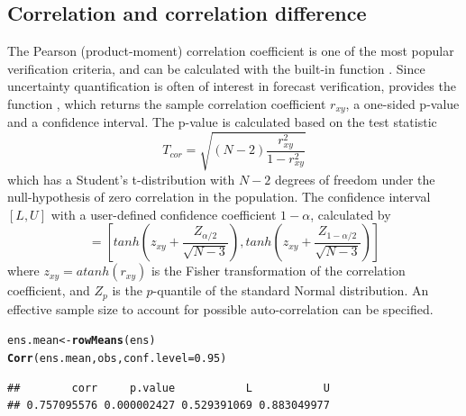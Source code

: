\documentclass[article]{jss}\usepackage{graphicx, color}
\makeatletter
\newcommand{\hlfunctioncall}[1]{\textcolor[rgb]{0,0.501960784313725,0.752941176470588}{\textbf{#1}}}%
\newenvironment{kframe}{%
 \def\at@end@of@kframe{}%
 \ifinner\ifhmode%
  \def\at@end@of@kframe{\end{minipage}}%
  \begin{minipage}{\columnwidth}%
 \fi\fi%
 \def\FrameCommand##1{\hskip\@totalleftmargin \hskip-\fboxsep
 \colorbox{shadecolor}{##1}\hskip-\fboxsep
     \hskip-\linewidth \hskip-\@totalleftmargin \hskip\columnwidth}%
 \MakeFramed {\advance\hsize-\width
   \@totalleftmargin\z@ \linewidth\hsize
   \@setminipage}}%
 {\par\unskip\endMakeFramed%
 \at@end@of@kframe}
\newenvironment{knitrout}{}{} %
\makeatother
\begin{document}
\subsection{Correlation and correlation difference}

The Pearson (product-moment) correlation coefficient is one of the most popular verification criteria, and can be calculated with the built-in  function .
Since uncertainty quantification is often of interest in forecast verification,  provides the function , which returns the sample correlation coefficient $r_{xy}$, a one-sided p-value and a confidence interval.
The p-value is calculated based on the test statistic
%
\begin{equation}
T_{cor} = \sqrt{(N-2) \frac{r_{xy}^2}{1 - r_{xy}^2}}
\end{equation}
%
which has a Student's t-distribution with $N-2$ degrees of freedom under the null-hypothesis of zero correlation in the population. 
The confidence interval $[L,U]$ with a user-defined confidence coefficient $1-\alpha$, calculated by
%
\begin{equation}
[L, U] = \left[ tanh\left(z_{xy} + \frac{Z_{\alpha/2}}{\sqrt{N-3}}\right), tanh\left(z_{xy} + \frac{Z_{1-\alpha/2}}{\sqrt{N-3}}\right)\right]\label{eq:fisherCi}
\end{equation} 
%
where $z_{xy} = atanh(r_{xy})$ is the Fisher transformation of the correlation coefficient, and $Z_p$ is the $p$-quantile of the standard Normal distribution.
An effective sample size to account for possible auto-correlation can be specified.
%
\begin{knitrout}
\color{fgcolor}\begin{kframe}
\begin{alltt}
ens.mean <- \hlfunctioncall{rowMeans}(ens)
\hlfunctioncall{Corr}(ens.mean, obs, conf.level=0.95)
\end{alltt}
\begin{verbatim}
##        corr     p.value           L           U 
## 0.757095576 0.000002427 0.529391069 0.883049977
\end{verbatim}
\end{kframe}
\end{knitrout}
\end{document}
